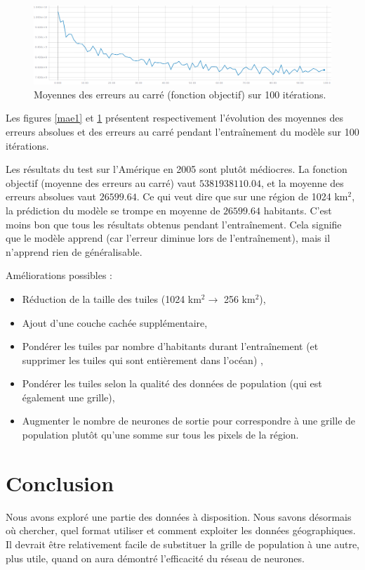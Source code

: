 \documentclass[a4paper, 11pt]{report}
\begin{document}
\begin{figure}
	\centering
	\includegraphics[width=1.0\textwidth]{img/mse1.png}
	\caption{Moyennes des erreurs au carré (fonction objectif) sur 100 itérations.}
	\label{mse1}
\end{figure}

Les figures \ref{mae1} et \ref{mse1} présentent respectivement l'évolution des moyennes des erreurs absolues et des erreurs au carré pendant l'entraînement du modèle sur 100 itérations.

Les résultats du test sur l'Amérique en 2005 sont plutôt médiocres. La fonction objectif (moyenne des erreurs au carré) vaut $5381938110.04$, et la moyenne des erreurs absolues vaut $26599.64$. Ce qui veut dire que sur une région de 1024 km$^2$, la prédiction du modèle se trompe en moyenne de $26599.64$ habitants. C'est moins bon que tous les résultats obtenus pendant l'entraînement. Cela signifie que le modèle apprend (car l'erreur diminue lors de l'entraînement), mais il n'apprend rien de généralisable.

Améliorations possibles :
\begin{itemize}
	\item Réduction de la taille des tuiles (1024 km$^2 \rightarrow$ 256 km$^2$),
	\item Ajout d'une couche cachée supplémentaire,
	\item Pondérer les tuiles par nombre d'habitants durant l'entraînement (et supprimer les tuiles qui sont entièrement dans l'océan) \cite{netpop-article},
	\item Pondérer les tuiles selon la qualité des données de population (qui est également une grille),
	\item Augmenter le nombre de neurones de sortie pour correspondre à une grille de population plutôt qu'une somme sur tous les pixels de la région.
\end{itemize}

\chapter{Conclusion}
Nous avons exploré une partie des données à disposition. Nous savons désormais où chercher, quel format utiliser et comment exploiter les données géographiques. Il devrait être relativement facile de substituer la grille de population à une autre, plus utile, quand on aura démontré l'efficacité du réseau de neurones.
\end{document}
